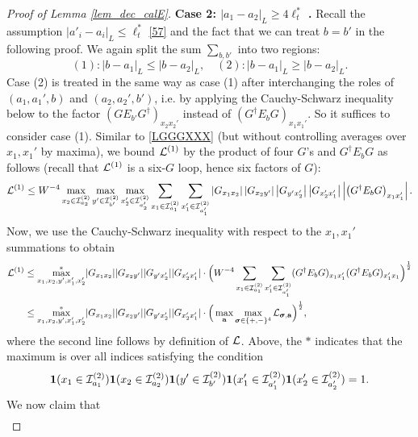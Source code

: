 \begin{proof}[Proof of Lemma \ref{lem_dec_calE}]
 \noindent 
{\bf Case 2: $|a_1-a_2|_{L}\ge 4\ell_t^*$ .} 
Recall  the assumption  $|a'_i-a_i|_{L}\le \ell_t^*$ \eqref{57} and the fact  that we can treat $b=b'$  in the following proof.  
We again split the sum $\sum_{b,b'}$ into two regions: 
$$
(1): |b -a_1|_{L}\le |b-a_2|_{L},\quad (2): |b-a_1|_{L}\ge |b-a_2|_{L}.
$$
Case (2) is treated in the same way as case (1) after interchanging the roles of $(a_{1},a_{1}',b)$ and $(a_{2},a_{2}',b')$, i.e. by applying the Cauchy-Schwarz inequality below to the factor $(GE_{b'}G^{\dagger})_{x_{2}x_{2}'}$ instead of $(G^{\dagger}E_{b}G)_{x_{1}x_{1}'}$. So it suffices to consider case (1). Similar to \eqref{LGGGXXX} (but without controlling averages over $x_{1},x_{1}'$ by maxima), we  bound ${\cal L}^{(1)}$ by the product of four $G$'s and  $G^\dagger E_b G$ as follows (recall that ${\cal L}^{(1)}$ is a six-$G$ loop, hence six factors of $G$):
\begin{align}
{\cal L}^{(1)}\le W^{-4}\max_{x_{2}\in{\cal I}^{(2)}_{a_{2}}}\max_{y'\in{\cal I}^{(2)}_{b'}}\max_{x_{2}'\in{\cal I}^{(2)}_{a_{2}'}}\sum_{x_{1}\in{\cal I}^{(2)}_{a_{1}}}\sum_{x_{1}'\in{\cal I}^{(2)}_{a_{1}'}}
\left|G_{x_1x_2}\right|
\left|G_{x_2y'}\right|
\left|G_{y'x_2'}\right|
\left|G_{ x_2'x_1'}\right|
\left|\left(G^\dagger E_b G\right)_{ x_1x_1'}\right|.\nonumber
\end{align}
Now, we use the Cauchy-Schwarz inequality with respect to the $x_{1},x_{1}'$ summations to obtain
\begin{align}\label{L6G6X}
{\cal L}^{(1)}&\leq \underset{x_{1},x_{2},y',x_{1}',x_{2}'}{\overset{\ast}{\max}}|G_{x_{1}x_{2}}||G_{x_{2}y'}||G_{y'x_{2}'}||G_{x_{2}'x_{1}'}|\cdot\Big(W^{-4}\sum_{x_{1}\in{\cal I}^{(2)}_{a_{1}}}\sum_{x_{1}'\in{\cal I}^{(2)}_{a_{1}'}}(G^{\dagger}E_{b}G)_{x_{1}x_{1}'}(G^{\dagger}E_{b}G)_{x_{1}'x_{1}}\Big)^{\frac12}\nonumber\\
&\leq\underset{x_{1},x_{2},y',x_{1}',x_{2}'}{\overset{\ast}{\max}}|G_{x_{1}x_{2}}||G_{x_{2}y'}||G_{y'x_{2}'}||G_{x_{2}'x_{1}'}|\cdot\Big(\max_{\textbf{a}}\max_{\boldsymbol{\sigma}\in\{+,-\}^{4}}{\cal L}_{\boldsymbol{\sigma},\textbf{a}}\Big)^{\frac12},
\end{align}
where the second line follows by definition of ${\cal L}$. Above, the $\ast$ indicates that the maximum is over all indices satisfying the condition
$$
 {\bf 1}(x_1\in {\cal I}_{a_1}^{(2)}){\bf 1}(x_2\in {\cal I}_{a_2}^{(2)}){\bf 1}(y'\in {\cal I}_{b'}^{(2)}){\bf 1}(x'_1\in {\cal I}_{a'_1}^{(2)}){\bf 1}(x'_2\in {\cal I}_{a'_2}^{(2)})=1.
$$
We now claim that 
\begin{align} \label{GGTLJ4G}

\end{align}
\end{proof}
